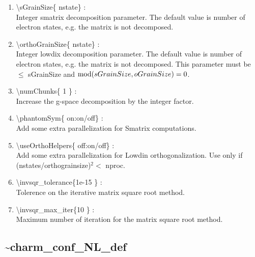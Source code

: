 \documentclass[12pt,titlepage]{article}
\begin{document}
\begin{enumerate}
  \vspace{0.15in} 
  \item \textbackslash sGrainSize\{ nstate\} : \\    
  Integer smatrix decomposition parameter. The default value is number of
  electron states, e.g. the matrix is not decomposed.
  \vspace{0.15in} 
  \item \textbackslash orthoGrainSize\{ nstate\} : \\    
  Integer lowdix decomposition parameter. The default value is number of
  electron states, e.g. the matrix is not decomposed. This parameter
  must be $\leq$ sGrainSize and ${\rm mod}(sGrainSize,oGrainSize)=0$.
  \vspace{0.15in} 
  \item \textbackslash numChunks\{ 1 \} : \\    
  Increase the g-space decomposition by the integer factor.
  \vspace{0.15in} 
  \item \textbackslash phantomSym\{ on:on/off\} : \\    
  Add some extra parallelization for Smatrix computations.
  \vspace{0.15in} 
  \item \textbackslash useOrthoHelpers\{ off:on/off\} : \\    
  Add some extra parallelization for Lowdin orthogonalization.
  Use only if (nstates/orthograinsize)$^2<$ nproc.
  \vspace{0.15in} 
  \item \textbackslash invsqr\_tolerance\{1e-15 \} : \\   
  Tolerence on the iterative matrix square root method.
  \vspace{0.15in} 
  \item \textbackslash invsqr\_max\_iter\{10 \} : \\    
  Maximum number of iteration for the matrix square root method.
\end{enumerate}

\newpage
\subsection*{\bf \~{ }charm\_conf\_NL\_def}
\end{document}
